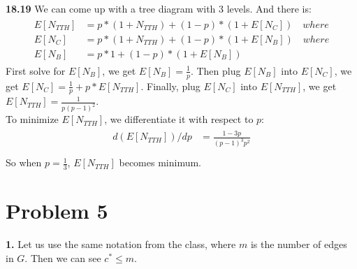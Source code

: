 \documentclass[titlepage, paper=a4, fontsize=11pt]{scrartcl} %
\numberwithin{equation}{section} %
\numberwithin{figure}{section} %
\numberwithin{table}{section} %
\begin{document}
\textbf{18.19}
We can come up with a tree diagram with 3 levels. And there is:
\begin{align*} 
\begin{split}
E[N_{TTH}] &= p * (1+N_{TTH}) + (1-p) * (1+E[N_C]) \quad where \\
E[N_C] &= p * (1+N_{TTH}) + (1-p) * (1+E[N_B]) \quad where \\
E[N_B] &= p * 1 + (1-p) * (1+E[N_B])
\end{split}					
\end{align*}
First solve for $E[N_B]$, we get $E[N_B] = \frac{1}{p}$. Then plug $E[N_B]$ into $E[N_C]$, we get
$E[N_C] = \frac{1}{p} + p * E[N_{TTH}]$. Finally, plug $E[N_C]$ into $E[N_{TTH}]$, we get $E[N_{TTH}] = \frac{1}{p(p-1)^2}$. \\
To minimize $E[N_{TTH}]$, we differentiate it with respect to $p$:
\begin{align*} 
\begin{split}
d(E[N_{TTH}])/dp &= \frac{1-3p}{(p-1)^3p^2} \\
\end{split}					
\end{align*}
So when $p=\frac{1}{3}$, $E[N_{TTH}]$ becomes minimum.
\\



\section*{Problem 5}
\textbf{1.}
Let us use the same notation from the class, where $m$ is the number of edges in $G$.
Then we can see $c^* \leq m$. \\
\end{document}
